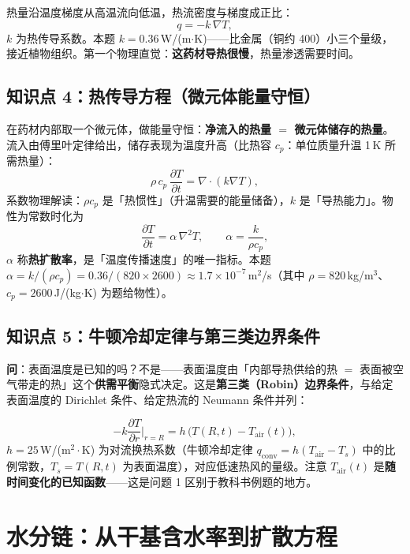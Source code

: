 \documentclass[12pt,a4paper]{ctexart}
\begin{document}
热量沿温度梯度从高温流向低温，热流密度与梯度成正比：
\begin{equation}
q=-k\,\nabla T,
\end{equation}
$k$ 为热传导系数。本题 $k=0.36$\,W/(m$\cdot$K)——比金属（铜约 400）小三个量级，接近植物组织。第一个物理直觉：\textbf{这药材导热很慢}，热量渗透需要时间。

\subsection{知识点 4：热传导方程（微元体能量守恒）}

在药材内部取一个微元体，做能量守恒：\textbf{净流入的热量 $=$ 微元体储存的热量}。流入由傅里叶定律给出，储存表现为温度升高（比热容 $c_p$：单位质量升温 1\,K 所需热量）：
\begin{equation}
\rho\,c_p\,\frac{\partial T}{\partial t}=\nabla\cdot(k\nabla T),
\label{eq:heat}
\end{equation}
系数物理解读：$\rho c_p$ 是「热惯性」（升温需要的能量储备），$k$ 是「导热能力」。物性为常数时化为
\begin{equation}
\frac{\partial T}{\partial t}=\alpha\,\nabla^2 T,\qquad \alpha=\frac{k}{\rho c_p},
\end{equation}
$\alpha$ 称\textbf{热扩散率}，是「温度传播速度」的唯一指标。本题 $\alpha=k/(\rho c_p)=0.36/(820\times2600)\approx1.7\times10^{-7}$\,m$^2$/s（其中 $\rho=820$\,kg/m$^3$、$c_p=2600$\,J/(kg$\cdot$K) 为题给物性）。

\subsection{知识点 5：牛顿冷却定律与第三类边界条件}

\textbf{问}：表面温度是已知的吗？不是——表面温度由「内部导热供给的热 $=$ 表面被空气带走的热」这个\textbf{供需平衡}隐式决定。这是\textbf{第三类（Robin）边界条件}，与给定表面温度的 Dirichlet 条件、给定热流的 Neumann 条件并列：

\begin{equation}
-k\frac{\partial T}{\partial r}\bigg|_{r=R}=h\,\big(T(R,t)-T_{\mathrm{air}}(t)\big),
\label{eq:bcT}
\end{equation}
$h=25$\,W/(m$^2\cdot$K) 为对流换热系数（牛顿冷却定律 $q_{\mathrm{conv}}=h(T_{\mathrm{air}}-T_s)$ 中的比例常数，$T_s=T(R,t)$ 为表面温度），对应低速热风的量级。注意 $T_{\mathrm{air}}(t)$ 是\textbf{随时间变化的已知函数}——这是问题 1 区别于教科书例题的地方。

\section{水分链：从干基含水率到扩散方程}
\end{document}
